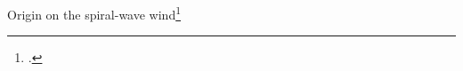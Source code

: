 


\begin{frame}{Origin on the spiral-wave wind\footcite{Nedora:2019jhl,Nedora:2020pak}}%


\end{frame}
